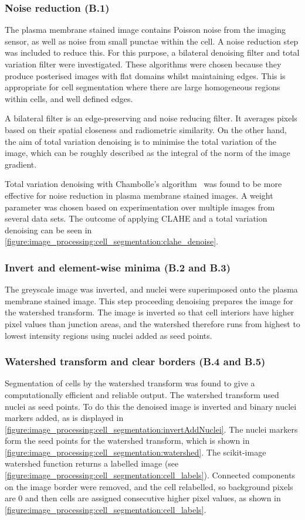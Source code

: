 \subsubsection{Noise reduction (B.1)}
The plasma membrane stained image contains Poisson noise from the imaging sensor, as well as noise from small punctae within the cell. A noise reduction step was included to reduce this. For this purpose, a bilateral denoising filter and total variation filter were investigated. These algorithms were chosen because they produce posterised images with flat domains whilst maintaining edges. This is appropriate for cell segmentation where there are large homogeneous regions within cells, and well defined edges.

A bilateral filter is an edge-preserving and noise reducing filter. It averages pixels based on their spatial closeness and radiometric similarity. On the other hand, the aim of total variation denoising is to minimise the total variation of the image, which can be roughly described as the integral of the norm of the image gradient.

Total variation denoising with Chambolle's algorithm~\cite{Chambolle2004} was found to be more effective for noise reduction in plasma membrane stained images. A weight parameter was chosen based on experimentation over multiple images from several data sets. The outcome of applying CLAHE and a total variation denoising can be seen in \autoref{figure:image_processing:cell_segmentation:clahe_denoise}.

\subsubsection{Invert and element-wise minima (B.2 and B.3)}
The greyscale image was inverted, and nuclei were superimposed onto the plasma membrane stained image. This step proceeding denoising prepares the image for the watershed transform. The image is inverted so that cell interiors have higher pixel values than junction areas, and the watershed therefore runs from highest to lowest intensity regions using nuclei added as seed points.

\subsubsection{Watershed transform and clear borders (B.4 and B.5)}
Segmentation of cells by the watershed transform was found to give a computationally efficient and reliable output. The watershed transform used nuclei as seed points. To do this the denoised image is inverted and binary nuclei markers added, as is displayed in \autoref{figure:image_processing:cell_segmentation:invertAddNuclei}. The nuclei markers form the seed points for the watershed transform, which is shown in \autoref{figure:image_processing:cell_segmentation:watershed}. The scikit-image watershed function returns a labelled image (see \autoref{figure:image_processing:cell_segmentation:cell_labels}). Connected components on the image border were removed, and the cell relabelled, so background pixels are 0 and then cells are assigned consecutive higher pixel values, as shown in \autoref{figure:image_processing:cell_segmentation:cell_labels}.

